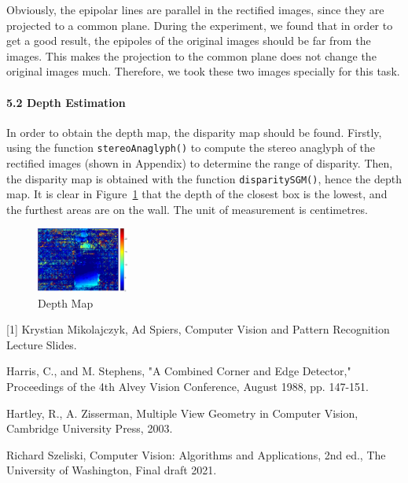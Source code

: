 \documentclass[10pt,twocolumn,letterpaper]{article}
\begin{document}
\noindent Obviously, the epipolar lines are parallel in the rectified images, since they are projected to a common plane. During the experiment, we found that in order to get a good result, the epipoles of the original images should be far from the images. This makes the projection to the common plane does not change the original images much. Therefore, we took these two images specially for this task. 


\paragraph{5.2 Depth Estimation} In order to obtain the depth map, the disparity map should be found. Firstly, using the function \texttt{\textcolor[RGB]{28,172,0}{stereoAnaglyph()}} to compute the stereo anaglyph of the rectified images (shown in Appendix) to determine the range of disparity. Then, the disparity map is obtained with the function \texttt{\textcolor[RGB]{28,172,0}{disparitySGM()}}, hence the depth map. It is clear in Figure~\ref{fig:8} that the depth of the closest box is the lowest, and the furthest areas are on the wall. The unit of measurement is centimetres.

\begin{figure}[h]
\begin{center}
   \includegraphics[width=0.27\textwidth]{5.21}
\end{center}
   \caption{Depth Map}
\label{fig:8}
\end{figure}

\clearpage

{\small


[1] Krystian Mikolajczyk, Ad Spiers, Computer Vision and Pattern Recognition Lecture Slides.

\noindent [2] Harris, C., and M. Stephens, "A Combined Corner and Edge Detector," Proceedings of the 4th Alvey Vision Conference, August 1988, pp. 147-151.

\noindent [3] Hartley, R., A. Zisserman, Multiple View Geometry in Computer Vision, Cambridge University Press, 2003.

\noindent [4] Richard Szeliski, Computer Vision: Algorithms and Applications, 2nd ed., The University of Washington, Final draft 2021.
}
\end{document}
